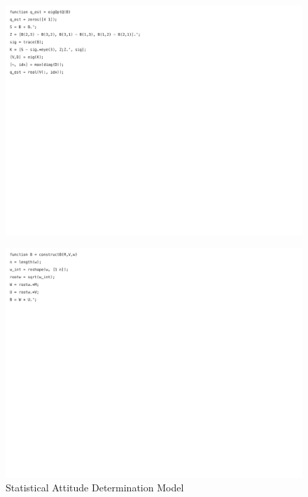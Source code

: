 \begin{figure}[H]
    \centering
    \captionsetup{ justification = centering }
    \includegraphics[trim={0cm 15cm 10cm 0cm},clip,width = 15cm]{Images/PS6/statisticalAttitude-2.png}
\end{figure}

\begin{figure}[H]
    \centering
    \captionsetup{ justification = centering }
    \includegraphics[trim={0cm 15cm 10cm 0cm},clip,width = 15cm]{Images/PS6/statisticalAttitude-3.png}
    \caption{Statistical Attitude Determination Model}
    \label{fig:stat_attitude}
\end{figure}


